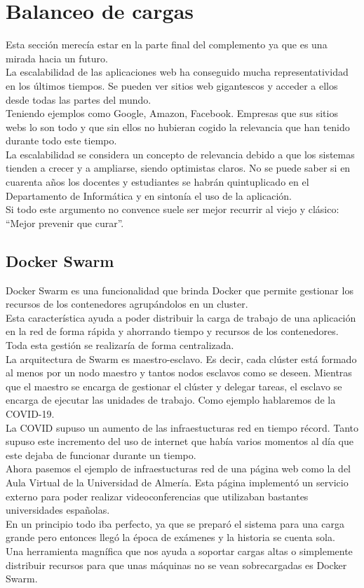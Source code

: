 \section{Balanceo de cargas}
Esta sección merecía estar en la parte final del complemento ya que es una mirada hacia un futuro.
\\La escalabilidad de las aplicaciones web ha conseguido mucha representatividad en los últimos tiempos. Se pueden ver sitios web gigantescos y acceder a ellos desde todas las partes del mundo.
\\Teniendo ejemplos como Google, Amazon, Facebook. Empresas que sus sitios webs lo son todo y que sin ellos no hubieran cogido la relevancia que han tenido durante todo este tiempo.
\\La escalabilidad se considera un concepto de relevancia debido a que los sistemas tienden a crecer y a ampliarse, siendo optimistas claros. No se puede saber si en cuarenta años los docentes y estudiantes se habrán quintuplicado en el Departamento de Informática y en sintonía el uso de la aplicación.
\\Si todo este argumento no convence suele ser mejor recurrir al viejo y clásico: ``Mejor prevenir que curar''.

\subsection{Docker Swarm}
Docker Swarm es una funcionalidad que brinda Docker que permite gestionar los recursos de los contenedores agrupándolos en un cluster.
\\Esta característica ayuda a poder distribuir la carga de trabajo de una aplicación en la red de forma rápida y ahorrando tiempo y recursos de los contenedores. Toda esta gestión se realizaría de forma centralizada.
\\La arquitectura de Swarm es maestro-esclavo. Es decir, cada clúster está formado al menos por un nodo maestro y tantos nodos esclavos como se deseen. Mientras que el maestro se encarga de gestionar el clúster y delegar tareas, el esclavo se encarga de ejecutar las unidades de trabajo. Como ejemplo hablaremos de la COVID-19.
\\La COVID supuso un aumento de las infraestucturas red en tiempo récord. Tanto supuso este incremento del uso de internet que había varios momentos al día que este dejaba de funcionar durante un tiempo.
\\Ahora pasemos el ejemplo de infraestucturas red de una página web como la del Aula Virtual de la Universidad de Almería. Esta página implementó un servicio externo para poder realizar videoconferencias que utilizaban bastantes universidades españolas.
\\En un principio todo iba perfecto, ya que se preparó el sistema para una carga grande pero entonces llegó la época de exámenes y la historia se cuenta sola.
\\Una herramienta magnífica que nos ayuda a soportar cargas altas o simplemente distribuir recursos para que unas máquinas no se vean sobrecargadas es Docker Swarm.

